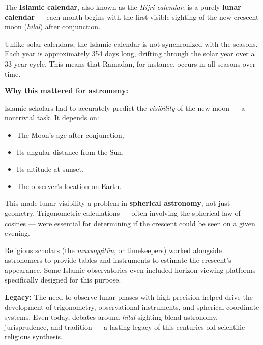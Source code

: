 \begin{tcolorbox}[colback=gray!5!white, colframe=black, title=\textbf{Historical Sidebar: The Islamic Lunar Calendar}, fonttitle=\bfseries, arc=1.5mm, boxrule=0.4pt]

    The \textbf{Islamic calendar}, also known as the \textit{Hijri calendar}, is a purely \textbf{lunar calendar} — each month begins with the first visible sighting of the new crescent moon (\textit{hilal}) after conjunction.
    
    Unlike solar calendars, the Islamic calendar is not synchronized with the seasons. Each year is approximately 354 days long, drifting through the solar year over a 33-year cycle. This means that Ramadan, for instance, occurs in all seasons over time.
    
    \medskip
    
    \textbf{Why this mattered for astronomy:}
    
    Islamic scholars had to accurately predict the \textit{visibility} of the new moon — a nontrivial task. It depends on:
    
    \begin{itemize}
        \item The Moon's age after conjunction,
        \item Its angular distance from the Sun,
        \item Its altitude at sunset,
        \item The observer's location on Earth.
    \end{itemize}
    
    This made lunar visibility a problem in \textbf{spherical astronomy}, not just geometry. Trigonometric calculations — often involving the spherical law of cosines — were essential for determining if the crescent could be seen on a given evening.
    
    \medskip
    
    Religious scholars (the \textit{muwaqqitūn}, or timekeepers) worked alongside astronomers to provide tables and instruments to estimate the crescent’s appearance. Some Islamic observatories even included horizon-viewing platforms specifically designed for this purpose.
    
    \medskip
    
    \textbf{Legacy:} The need to observe lunar phases with high precision helped drive the development of trigonometry, observational instruments, and spherical coordinate systems. Even today, debates around \textit{hilal} sighting blend astronomy, jurisprudence, and tradition — a lasting legacy of this centuries-old scientific-religious synthesis.
    
\end{tcolorbox}


